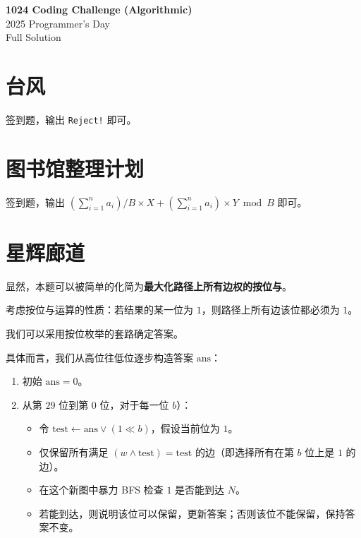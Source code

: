 \documentclass[14pt,a4paper]{article}
\begin{document}
\vspace*{\fill}
\begin{center}
  {\Huge \bfseries 1024 Coding Challenge (Algorithmic)}\\[1em]
  { \Large 2025 Programmer's Day }\\[1em]
  { \Large Full Solution}\\[1em]
\end{center}
\vspace*{\fill}
\clearpage

\section{台风}
签到题，输出 \texttt{Reject!} 即可。

\section{图书馆整理计划}
签到题，输出 $\left(\sum_{i=1}^{n} a_i\right)/B\times X + \left(\sum_{i=1}^{n} a_i\right) \times Y \bmod B $ 即可。


\section{星辉廊道}
显然，本题可以被简单的化简为\textbf{最大化路径上所有边权的按位与}。

\begin{hintbox}
考虑按位与运算的性质：若结果的某一位为 $1$，则路径上所有边该位都必须为 $1$。
\end{hintbox}

我们可以采用按位枚举的套路确定答案。

具体而言，我们从高位往低位逐步构造答案 $\text{ans}$：

\begin{enumerate}
  \item 初始 $\text{ans}=0$。
  \item 从第 $29$ 位到第 $0$ 位，对于每一位 $b$）：
  \begin{itemize}
  \item 令 $\text{test} \leftarrow \text{ans} \lor (1 \ll b)$，假设当前位为 $1$。
  \item 仅保留所有满足 $(w \land \text{test}) = \text{test}$ 的边（即选择所有在第 $b$ 位上是 $1$ 的边）。
  \item 在这个新图中暴力 BFS 检查 $1$ 是否能到达 $N$。
  \item 若能到达，则说明该位可以保留，更新答案；否则该位不能保留，保持答案不变。
  \end{itemize}
\end{enumerate}
\end{document}
